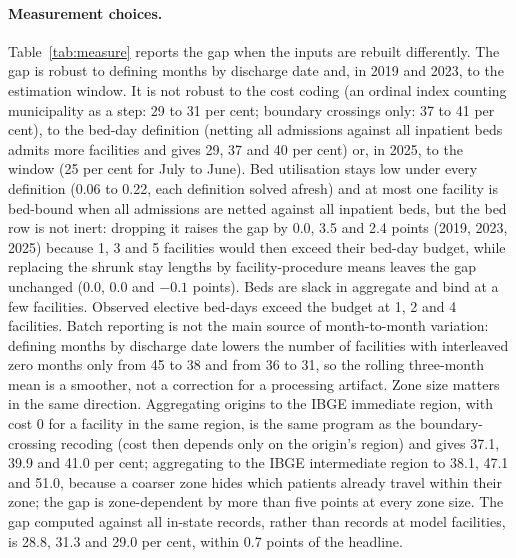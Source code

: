 \paragraph{Measurement choices.} Table~\ref{tab:measure} reports the gap when the inputs are rebuilt differently. The gap is robust
to defining months by discharge date and, in 2019 and 2023, to the estimation window. It is not robust to the cost coding (an
ordinal index counting municipality as a step: 29 to 31 per cent; boundary crossings only: 37 to 41 per cent), to the bed-day
definition (netting all admissions against all inpatient beds admits more facilities and gives 29, 37 and 40 per cent) or, in 2025, to
the window (25 per cent for July to June). Bed utilisation stays low under every definition (0.06 to 0.22, each definition solved afresh) and at most one facility is bed-bound when all admissions are netted against all inpatient beds, but the bed row is not inert: dropping it raises the gap by 0.0, 3.5 and 2.4 points (2019, 2023, 2025) because 1, 3 and 5
facilities would then exceed their bed-day budget, while replacing the shrunk stay lengths by facility-procedure means leaves the gap unchanged (0.0, 0.0 and $-0.1$ points). Beds are slack in aggregate and bind at a few facilities.
Observed elective bed-days exceed the budget at 1, 2 and 4 facilities. Batch
reporting is not the main source of month-to-month variation: defining months by discharge date lowers the number of facilities with
interleaved zero months only from 45 to 38 and from 36 to 31, so the rolling three-month mean is a smoother, not a correction for a
processing artifact. Zone size matters in the same direction. Aggregating origins to the IBGE immediate region, with cost 0 for a facility in the same region, is the same program as the boundary-crossing recoding (cost then depends only on the origin's region) and gives 37.1, 39.9 and 41.0 per cent; aggregating to the IBGE intermediate region to 38.1,
47.1 and 51.0, because a coarser zone hides which patients already travel within their zone; the gap is zone-dependent by more than five
points at every zone size. The gap computed against all in-state records, rather than records at model facilities, is 28.8, 31.3 and 29.0
per cent, within 0.7 points of the headline.

